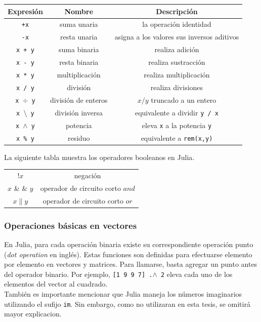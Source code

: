 \begin{tabular}{|c|c|c|}
\hline 
\rule[-1ex]{0pt}{2.5ex} Expresión & Nombre & Descripción \\ 
\hline 
\rule[-1ex]{0pt}{2.5ex} \texttt{+x} & suma unaria & la operación identidad \\ 
\hline 
\rule[-1ex]{0pt}{2.5ex} \texttt{-x} & resta unaria & asigna a los valores sus inversos aditivos \\ 
\hline 
\rule[-1ex]{0pt}{2.5ex} \texttt{x + y} & suma binaria & realiza adición \\ 
\hline 
\rule[-1ex]{0pt}{2.5ex} \texttt{x - y} & resta binaria & realiza sustracción \\
\hline 
\rule[-1ex]{0pt}{2.5ex} \texttt{x * y} & multiplicación & realiza multiplicación \\
\hline 
\rule[-1ex]{0pt}{2.5ex} \texttt{x / y} & división & realiza divisiones \\
\hline 
\rule[-1ex]{0pt}{2.5ex} \texttt{x $\div$ y} & división de enteros & $x / y$ truncado a un entero \\
\hline 
\rule[-1ex]{0pt}{2.5ex} \texttt{x $\setminus$ y} & división inversa & equivalente a dividir \texttt{y / x} \\
\hline 
\rule[-1ex]{0pt}{2.5ex} \texttt{x $\wedge$ y} & potencia & eleva \texttt{x} a la potencia \texttt{y} \\
\hline 
\rule[-1ex]{0pt}{2.5ex} \texttt{x \% y} & residuo & equivalente a \texttt{rem(x,y)} \\
\hline 
\end{tabular} 


La siguiente tabla muestra los operadores booleanos en Julia. 

\begin{center}
\begin{tabular}{ |c|c| } 
 \hline
 $!x$ & negación \\ 
 $x$ \& \& $y$ & operador de circuito corto $and$ \\ 
 $x \parallel y$ & operador de circuito corto $or$ \\ 
 \hline
\end{tabular}
\end{center}

\subsubsection{Operaciones básicas en vectores}
En Julia, para cada operación binaria existe su correspondiente operación punto (\textit{dot operation} en inglés). Estas funciones son definidas para efectuarse elemento por elemento en vectores y matrices. Para llamarse, basta agregar un punto antes del operador binario. Por ejemplo,
 \texttt{[1 9 9 7] .$\wedge$ 2} eleva cada uno de los elementos del vector al cuadrado. 
\\
También es importante mencionar que Julia maneja los números imaginarios utilizando el sufijo \texttt{im}. Sin embargo, como no utilizaran en esta tesis, se omitirá mayor explicacion. 



